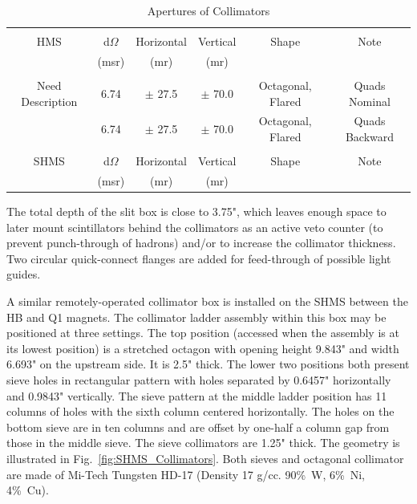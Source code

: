 {\begin{table}
\begin{center}
\caption{Apertures of Collimators\label{tab:apertures}}
\begin{tabular}{|c|c|c|c|c|c|}
\hline
{} & {} & {} & {} & {} & {} \\
HMS				& d$\Omega$ 	& Horizontal 	& Vertical 		& Shape 			& Note \\
{} 				& (msr) 		& (mr) 		& (mr) 		& {} 				& {} \\
{} & {} & {} & {} & {} & {} \\ \hline
{}Need Description	& 6.74 		& $\pm$ 27.5 	& $\pm$ 70.0 	& Octagonal, Flared 	& Quads Nominal \\
{}	 			& 6.74 		& $\pm$ 27.5 	& $\pm$ 70.0 	& Octagonal, Flared 	& Quads Backward \\
{} & {} & {} & {} & {} & {} \\ \hline
SHMS			& d$\Omega$ 	& Horizontal 	& Vertical 		& Shape 			& Note \\
{} 				& (msr) 		& (mr) 		& (mr) 		& {} 				& {} \\
\hline
\end{tabular}
\end{center}
\end{table}

The total depth of the slit box is close to 3.75", which leaves
enough space to later mount scintillators behind the collimators as an active
veto counter (to prevent punch-through of hadrons) and/or to increase
the collimator thickness. Two circular quick-connect flanges are
added for feed-through of possible light guides.

A similar remotely-operated collimator box is installed on the SHMS between the
HB and Q1 magnets. The collimator ladder assembly within this box may be positioned
at three settings. The top position (accessed when the assembly is at its lowest
position) is a stretched octagon with opening height 9.843" and width 6.693" on the
upstream side. It is 2.5" thick. The lower two positions both present sieve holes in
rectangular pattern with holes separated by 0.6457" horizontally and 0.9843"
vertically. The sieve pattern at the middle ladder position has 11 columns of holes with
the sixth column centered horizontally. The holes on the bottom sieve are in ten
columns and are offset by one-half a column gap from those in the middle sieve.
The sieve collimators are 1.25" thick. The geometry is illustrated in Fig.~\ref{fig:SHMS_Collimators}.
Both sieves and octagonal collimator are
made of Mi-Tech\texttrademark{} Tungsten HD-17 (Density 17 g/cc. 90\%~W, 6\%~Ni, 4\%~Cu).

}
